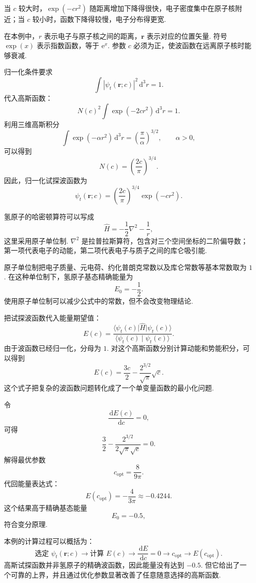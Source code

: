 \documentclass[UTF8,11pt,a4paper,openany]{ctexbook}
\newcommand{\ket}[1]{\lvert #1\rangle}\newcommand{\bra}[1]{\langle #1\rvert}
\newcommand{\braket}[2]{\langle #1\mid #2\rangle}\newcommand{\ii}{\mathrm i}
\newcommand{\dd}{\,\mathrm d}\newcommand{\Ham}{\hat H}\newcommand{\tr}{\operatorname{Tr}}
\begin{document}
当 $c$ 较大时，$\exp(-cr^2)$ 随距离增加下降得很快，电子密度集中在原子核附近；当 $c$ 较小时，函数下降得较慢，电子分布得更宽. 

\begin{notationbox}
在本例中，$r$ 表示电子与原子核之间的距离，$\boldsymbol r$ 表示对应的位置矢量. 符号 $\exp(x)$ 表示指数函数，等于 $\mathrm e^x$. 参数 $c$ 必须为正，使波函数在远离原子核时能够衰减. 
\end{notationbox}

归一化条件要求
\[
\int |\psi_t(\boldsymbol r;c)|^2\dd^3r=1.
\]
代入高斯函数：
\[
N(c)^2\int \exp(-2cr^2)\dd^3r=1.
\]
利用三维高斯积分
\[
\int \exp(-\alpha r^2)\dd^3r
=\left(\frac{\pi}{\alpha}\right)^{3/2},
\qquad \alpha>0,
\]
可以得到
\[
N(c)=\left(\frac{2c}{\pi}\right)^{3/4}.
\]
因此，归一化试探波函数为
\[
\psi_t(\boldsymbol r;c)
=
\left(\frac{2c}{\pi}\right)^{3/4}
\exp(-cr^2).
\]

氢原子的哈密顿算符可以写成
\[
\hat H
=
-\frac{1}{2}\nabla^2-\frac{1}{r},
\]
这里采用原子单位制. $\nabla^2$ 是拉普拉斯算符，包含对三个空间坐标的二阶偏导数；第一项代表电子的动能，第二项代表电子与质子之间的库仑吸引能. 

\begin{notationbox}
原子单位制把电子质量、元电荷、约化普朗克常数以及库仑常数等基本常数取为 $1$. 在这种单位制下，氢原子基态精确能量为
\[
E_0=-\frac12.
\]
使用原子单位制可以减少公式中的常数，但不会改变物理结论. 
\end{notationbox}

把试探波函数代入能量期望值：
\[
E(c)=
\frac{\bra{\psi_t(c)}\hat H\ket{\psi_t(c)}}
{\braket{\psi_t(c)}{\psi_t(c)}}.
\]
由于波函数已经归一化，分母为 $1$. 对这个高斯函数分别计算动能和势能积分，可以得到
\[
E(c)=\frac{3c}{2}
-\frac{2^{3/2}}{\sqrt{\pi}}\sqrt{c}.
\]
这个式子把复杂的波函数问题转化成了一个单变量函数的最小化问题. 

令
\[
\frac{\dd E(c)}{\dd c}=0,
\]
可得
\[
\frac32
-\frac{2^{3/2}}{2\sqrt{\pi}\sqrt c}=0.
\]
解得最优参数
\[
c_{\mathrm{opt}}=\frac{8}{9\pi}.
\]
代回能量表达式：
\[
E(c_{\mathrm{opt}})
=-\frac{4}{3\pi}
\approx -0.4244.
\]
这个结果高于精确基态能量
\[
E_0=-0.5,
\]
符合变分原理. 

\begin{derivationbox}
本例的计算过程可以概括为：
\[
\text{选定 }\psi_t(\boldsymbol r;c)
\longrightarrow
\text{计算 }E(c)
\longrightarrow
\frac{\dd E}{\dd c}=0
\longrightarrow
c_{\mathrm{opt}}
\longrightarrow
E(c_{\mathrm{opt}}).
\]
高斯试探函数并非氢原子的精确波函数，因此能量没有达到 $-0.5$. 但它给出了一个可靠的上界，并且通过优化参数显著改善了任意随意选择的高斯函数. 
\end{derivationbox}
\end{document}
